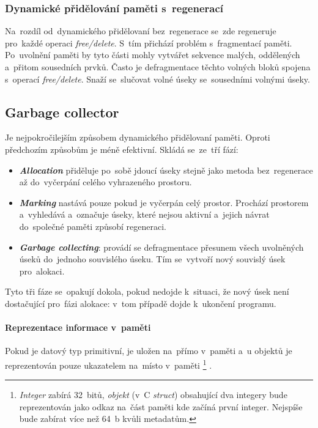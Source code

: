 \subsubsection{Dynamické přidělování paměti s~regenerací}

Na~rozdíl od~dynamického přidělovaní bez~regenerace se~zde regeneruje pro~každé operaci \emph{free/delete}. S~tím přichází problém s~fragmentací paměti. Po~uvolnění paměti by tyto části mohly vytvářet sekvence malých, oddělených a~přitom sousedních prvků. Často je defragmentace těchto volných bloků spojena s~operací \emph{free/delete}. Snaží se~slučovat volné úseky se~sousedními volnými úseky.

\subsection{Garbage collector}

Je nejpokročilejším způsobem dynamického přidělovaní paměti. Oproti předchozím způsobům je méně efektivní. Skládá se~ze~tří fází:

\begin{itemize}
	\item \emph{\textbf{Allocation}} přiděluje po~sobě jdoucí úseky stejně jako metoda bez~regenerace až do~vyčerpání celého vyhrazeného prostoru.
	\item \emph{\textbf{Marking}} nastává pouze pokud je vyčerpán celý prostor. Prochází prostorem a~vyhledává a~označuje úseky, které nejsou aktivní a~jejich návrat do~společné paměti způsobí regeneraci.
	\item \emph{\textbf{Garbage collecting}}: provádí se defragmentace přesunem všech uvolněných úseků do~jednoho souvislého úseku. Tím se~vytvoří nový souvislý úsek pro~alokaci.
\end{itemize}

Tyto tři fáze se~opakují dokola, pokud nedojde k~situaci, že nový úsek není dostačující pro~fázi alokace: v~tom případě dojde k~ukončení programu.

\paragraph{Reprezentace informace v~paměti} Pokud je datový typ primitivní, je uložen na~přímo v~paměti a~u objektů je reprezentován pouze ukazatelem na~místo v~paměti%
\footnote{\textit{Integer} zabírá 32~bitů, \textit{objekt} (v~C \textit{struct}) obsahující dva integery bude reprezentován jako odkaz na~část paměti kde začíná první integer. Nejspíše bude zabírat více než 64~b kvůli metadatům.}%
.

